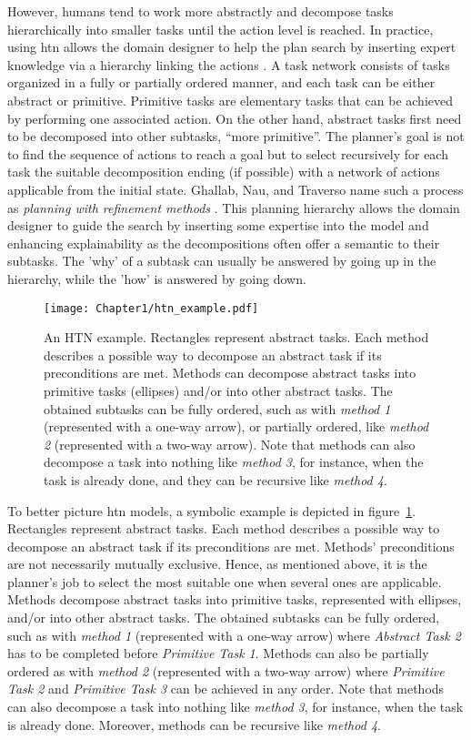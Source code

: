 However, humans tend to work more abstractly and decompose tasks hierarchically into smaller tasks until the action level is reached. In practice, using \acrfull{htn} allows the domain designer to help the plan search by inserting expert knowledge via a hierarchy linking the actions \cite{erol_complexity_1996}. A task network consists of tasks organized in a fully or partially ordered manner, and each task can be either abstract or primitive. Primitive tasks are elementary tasks that can be achieved by performing one associated action.
On the other hand, abstract tasks first need to be decomposed into other subtasks, ``more primitive''. The planner's goal is not to find the sequence of actions to reach a goal but to select recursively for each task the suitable decomposition ending (if possible) with a network of actions applicable from the initial state. Ghallab, Nau, and Traverso name such a process as \textit{planning with refinement methods} \cite{ghallab2016automated}. This planning hierarchy allows the domain designer to guide the search by inserting some expertise into the model and enhancing explainability as the decompositions often offer a semantic to their subtasks. The 'why' of a subtask can usually be answered by going up in the hierarchy, while the 'how' is answered by going down. 

\begin{figure}
    \center
    \texttt{[image: Chapter1/htn\_example.pdf]}
    \caption{An HTN example. Rectangles represent abstract tasks. Each method describes a possible way to decompose an abstract task if its preconditions are met. Methods can decompose abstract tasks into primitive tasks (ellipses) and/or into other abstract tasks. The obtained subtasks can be fully ordered, such as with \emph{method 1} (represented with a one-way arrow), or partially ordered, like \emph{method 2} (represented with a two-way arrow). Note that methods can also decompose a task into nothing like \emph{method 3}, for instance, when the task is already done, and they can be recursive like \emph{method 4}.
    }
    \label{fig:htn_example}
\end{figure}

To better picture \acrshort{htn} models, a symbolic example is depicted in figure~\ref{fig:htn_example}.
Rectangles represent abstract tasks. Each method describes a possible way to decompose an abstract task if its preconditions are met. Methods' preconditions are not necessarily mutually exclusive. Hence, as mentioned above, it is the planner's job to select the most suitable one when several ones are applicable.
Methods decompose abstract tasks into primitive tasks, represented with ellipses, and/or into other abstract tasks. The obtained subtasks can be fully ordered, such as with \emph{method 1} (represented with a one-way arrow) where \emph{Abstract Task 2} has to be completed before \emph{Primitive Task 1}. Methods can also be partially ordered as with \emph{method 2} (represented with a two-way arrow) where \emph{Primitive Task 2} and \emph{Primitive Task 3} can be achieved in any order. Note that methods can also decompose a task into nothing like \emph{method 3}, for instance, when the task is already done. Moreover, methods can be recursive like \emph{method 4}.


